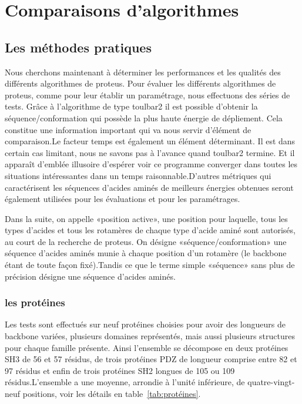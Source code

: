 \chapter{Comparaisons d'algorithmes}
\label{chap:resultats_comparaisons}


\section{Les méthodes pratiques} 
\label{sec:methodes_pratiques}
Nous cherchons maintenant à déterminer les performances et les qualités des différents algorithmes de proteus.
Pour évaluer les différents algorithmes de proteus, comme pour leur établir un paramétrage, nous effectuons des séries de tests. 
Grâce à l'algorithme de type toulbar2 il est possible d'obtenir la séquence/conformation qui possède la plus haute énergie de dépliement. Cela constitue une information important qui va nous servir d'élément de comparaison.Le facteur temps est également un élément déterminant. Il est dans certain cas limitant, nous ne savons pas à l'avance quand toulbar2 termine. Et il apparaît d'emblée illusoire d'espérer voir ce programme converger dans toutes les situations intéressantes dans un temps raisonnable.D'autres métriques qui caractérisent les séquences d'acides aminés de meilleurs énergies obtenues seront également utilisées pour les évaluations et pour les paramétrages.   

Dans la suite, on appelle «position active», une position pour laquelle, tous les types d'acides et tous les rotamères de chaque type d'acide aminé sont autorisés, au court de la recherche de proteus. On désigne «séquence/conformation» une séquence d'acides aminés munie à chaque position d'un rotamère (le backbone étant de toute façon fixé).Tandis ce que le terme simple «séquence»  sans plus de précision désigne une séquence d'acides aminés.

\subsection{les protéines}
 
Les tests sont effectués sur neuf protéines choisies pour avoir des longueurs de backbone variées, plusieurs domaines représentés, mais aussi plusieurs structures pour chaque famille présente. Ainsi l'ensemble se décompose en deux protéines SH3 de 56 et 57 résidus, de trois protéines PDZ de longueur comprise entre 82 et 97 résidus  et enfin de trois protéines SH2 longues de 105 ou 109 résidus.L'ensemble a une moyenne, arrondie à l'unité inférieure, de quatre-vingt-neuf positions, voir les détails en table~\ref{tab:protéines}. 
  

